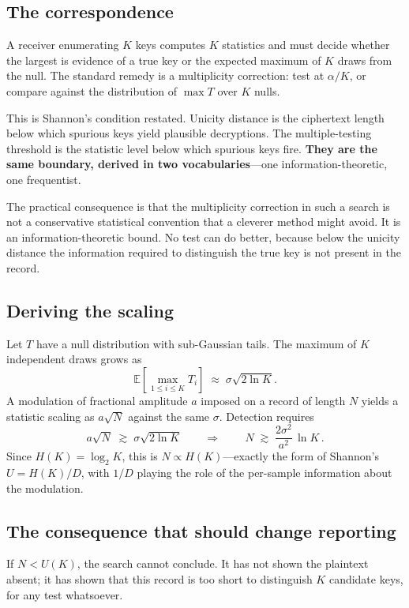 \subsection{The correspondence}

A receiver enumerating $K$ keys computes $K$ statistics and must decide whether
the largest is evidence of a true key or the expected maximum of $K$ draws from
the null. The standard remedy is a multiplicity correction: test at $\alpha/K$,
or compare against the distribution of $\max T$ over $K$ nulls.

This is Shannon's condition restated. Unicity distance is the ciphertext length
below which spurious keys yield plausible decryptions. The multiple-testing
threshold is the statistic level below which spurious keys fire. \textbf{They are
the same boundary, derived in two vocabularies}---one information-theoretic, one
frequentist.

The practical consequence is that the multiplicity correction in such a search is
not a conservative statistical convention that a cleverer method might avoid. It
is an information-theoretic bound. No test can do better, because below the
unicity distance the information required to distinguish the true key is not
present in the record.

\subsection{Deriving the scaling}\label{sec:derive}

Let $T$ have a null distribution with sub-Gaussian tails. The maximum of $K$
independent draws grows as
\[
  \mathbb{E}\!\left[\max_{1\le i\le K} T_i\right] \;\approx\; \sigma\sqrt{2\ln K}.
\]
A modulation of fractional amplitude $a$ imposed on a record of length $N$ yields
a statistic scaling as $a\sqrt{N}$ against the same $\sigma$. Detection requires
\[
  a\sqrt{N} \;\gtrsim\; \sigma\sqrt{2\ln K}
  \qquad\Longrightarrow\qquad
  \boxed{\,N \;\gtrsim\; \frac{2\sigma^{2}}{a^{2}}\,\ln K\,.}
\]
Since $H(K)=\log_2 K$, this is $N \propto H(K)$---exactly the form of Shannon's
$U = H(K)/D$, with $1/D$ playing the role of the per-sample information about the
modulation.

\subsection{The consequence that should change reporting}\label{sec:void}

If $N < U(K)$, the search cannot conclude. It has not shown the plaintext absent;
it has shown that this record is too short to distinguish $K$ candidate keys, for
any test whatsoever.

